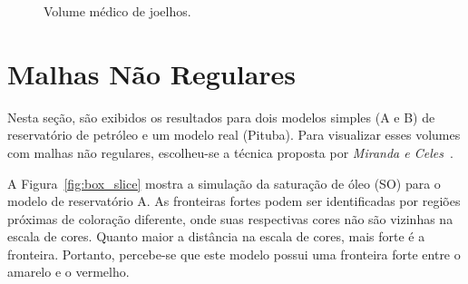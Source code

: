 \begin{figure}[h]
	\centering
	\caption{Volume médico de joelhos.}
\end{figure}

\clearpage
\section{Malhas Não Regulares}
\label{sec:result.irreg}

	Nesta seção, são exibidos os resultados para dois modelos simples (A e B) de reservatório de petróleo e um modelo real (Pituba). Para visualizar esses volumes com malhas não regulares, escolheu-se a técnica proposta por \textit{Miranda e Celes}~\cite{miranda}.
	
	A Figura~\ref{fig:box_slice} mostra a simulação da saturação de óleo (SO) para o modelo de reservatório A. As fronteiras fortes podem ser identificadas por regiões próximas de coloração diferente, onde suas respectivas cores não são vizinhas na escala de cores. Quanto maior a distância na escala de cores, mais forte é a fronteira. Portanto, percebe-se que este modelo possui uma fronteira forte entre o amarelo e o vermelho.\\
	
